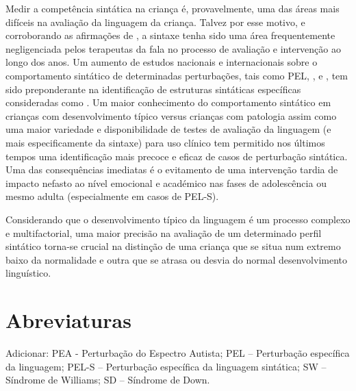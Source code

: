 \documentclass[output=paper]{LSP/langsci}
\begin{document}
Medir a competência sintática na criança é, provavelmente, uma das áreas mais difíceis na avaliação da linguagem da criança. Talvez por esse motivo, e corroborando as afirmações de \cite{schlichtinglutjespelberg2003}, a sintaxe tenha sido uma área frequentemente negligenciada pelos terapeutas da fala no processo de avaliação e intervenção ao longo dos anos. Um aumento de estudos nacionais e internacionais sobre o comportamento sintático de determinadas perturbações, tais como PEL, ,  e , tem sido preponderante na identificação de estruturas sintáticas específicas consideradas como . Um maior conhecimento do comportamento sintático em crianças com desenvolvimento típico versus crianças com patologia assim como uma maior variedade e disponibilidade de testes de avaliação da linguagem (e mais especificamente da sintaxe) para uso clínico tem permitido nos últimos tempos uma identificação mais precoce e eficaz de casos de perturbação sintática. Uma das consequências imediatas é o evitamento de uma intervenção tardia de impacto nefasto ao nível emocional e académico nas fases de adolescência ou mesmo adulta (especialmente em casos de PEL-S). 

Considerando que o desenvolvimento típico da linguagem é um processo complexo e multifactorial, uma maior precisão na avaliação de um determinado perfil sintático torna-se crucial na distinção de uma criança que se situa num extremo baixo da normalidade e outra que se atrasa ou desvia do normal desenvolvimento linguístico.

\section*{Abreviaturas}
Adicionar: PEA - Perturbação do Espectro Autista; PEL – Perturbação específica da linguagem; PEL-S – Perturbação específica da linguagem sintática; SW – Síndrome de Williams; SD – Síndrome de Down.




































{\sloppy
\printbibliography[heading=subbibliography,notkeyword=this]
}
\end{document}
